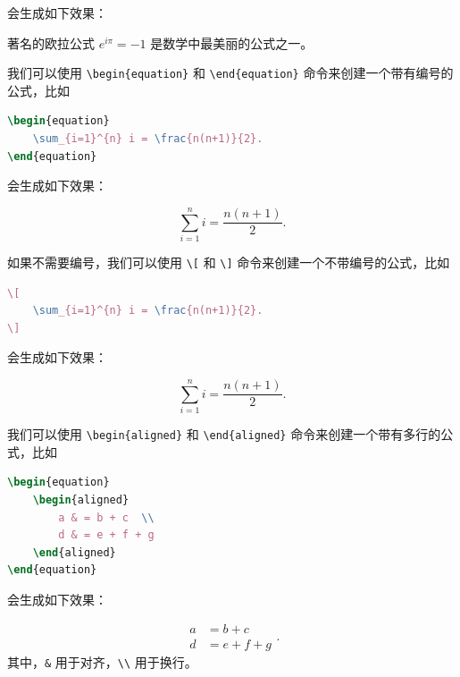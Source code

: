\noindent 会生成如下效果：

著名的欧拉公式 \(e^{i\pi} = -1\) 是数学中最美丽的公式之一。


我们可以使用 \texttt{\textbackslash begin\{equation\}} 和 \texttt{\textbackslash end\{equation\}} 命令来创建一个带有编号的公式，比如

\begin{lstlisting}[language=TeX]
\begin{equation}
    \sum_{i=1}^{n} i = \frac{n(n+1)}{2}.
\end{equation}
\end{lstlisting}

\noindent 会生成如下效果：

\begin{equation}
    \sum_{i=1}^{n} i = \frac{n(n+1)}{2}.
\end{equation}

如果不需要编号，我们可以使用 \texttt{\textbackslash [} 和 \texttt{\textbackslash ]} 命令来创建一个不带编号的公式，比如

\begin{lstlisting}[language=TeX]
\[ 
    \sum_{i=1}^{n} i = \frac{n(n+1)}{2}.
\]
\end{lstlisting}

\noindent 会生成如下效果：

\[ 
    \sum_{i=1}^{n} i = \frac{n(n+1)}{2}.
\]

我们可以使用 \texttt{\textbackslash begin\{aligned\}} 和 \texttt{\textbackslash end\{aligned\}} 命令来创建一个带有多行的公式，比如

\begin{lstlisting}[language=TeX]
\begin{equation}
    \begin{aligned}
        a & = b + c  \\ 
        d & = e + f + g
    \end{aligned}
\end{equation}
\end{lstlisting}

\noindent 会生成如下效果：

\begin{equation}
    \begin{aligned}
        a & = b + c      \\ 
        d & = e + f + g
    \end{aligned}.
\end{equation}
其中，\texttt{\&} 用于对齐，\texttt{\textbackslash\textbackslash} 用于换行。

